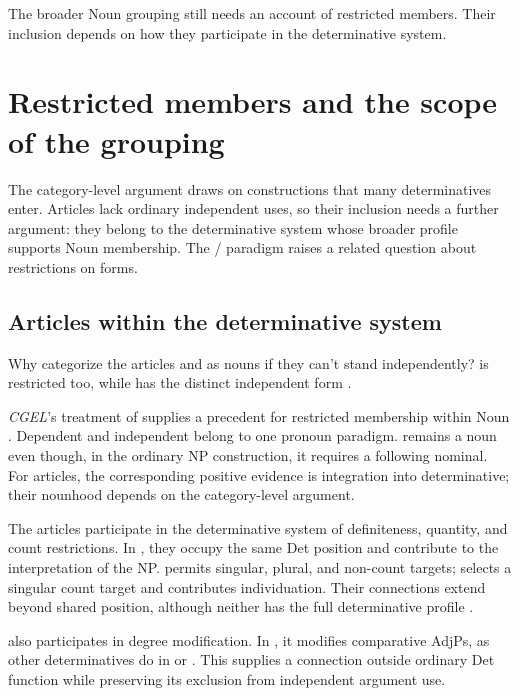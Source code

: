 \documentclass[12pt]{article}
\begin{document}
The broader Noun grouping still needs an account of restricted members. Their inclusion depends on how they participate in the determinative system.

\section{Restricted members and the scope of the grouping}\label{sec:articles}

The category-level argument draws on constructions that many determinatives enter. Articles lack ordinary independent uses, so their inclusion needs a further argument: they belong to the determinative system whose broader profile supports Noun membership. The / paradigm raises a related question about restrictions on forms.

\subsection{Articles within the determinative system}\label{sec:article-membership}

Why categorize the articles  and  as nouns if they can't stand independently?  is restricted too, while  has the distinct independent form  \citep[371--372, 410--411]{huddleston2002}.

\textit{CGEL}'s treatment of  supplies a precedent for restricted membership within Noun \citep[470--471]{huddleston2002}. Dependent  and independent  belong to one pronoun paradigm.  remains a noun even though, in the ordinary NP construction, it requires a following nominal. For articles, the corresponding positive evidence is integration into determinative; their nounhood depends on the category-level argument.

The articles participate in the determinative system of definiteness, quantity, and count restrictions. In , they occupy the same Det position and contribute to the interpretation of the NP.  permits singular, plural, and non-count targets;  selects a singular count target and contributes individuation. Their connections extend beyond shared position, although neither has the full determinative profile \citep[368--373]{huddleston2002}.

 also participates in degree modification. In , it modifies comparative AdjPs, as other determinatives do in  or  \citep[1131--1132, 1135--1136]{huddleston2002}. This supplies a connection outside ordinary Det function while preserving its exclusion from independent argument use.
\end{document}
